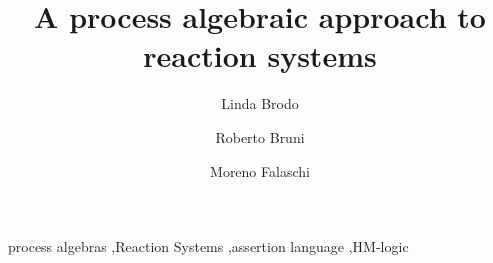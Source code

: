 \documentclass{elsarticle}
\begin{document}
\begin{frontmatter}

\title{A process algebraic approach to reaction systems
}



 \author[uniss]{Linda Brodo}
 
 \author[unipi]{Roberto Bruni}
 
 \author[unisi]{Moreno Falaschi}
 
 \address[unipi]{Dipartimento di Informatica, Universit\`{a} di Pisa, Italy}
 \address[uniss]{Dipartimento di Scienze Economiche e Aziendali,   Universit\`a di Sassari, Italy}
 \address[unisi]{Dipartimento di Ingegneria dell'Informazione e Scienze Matematiche,   Univ. di Siena, Italy}
 



\begin{abstract}

\end{abstract}

\begin{keyword}
process algebras \sep Reaction Systems \sep assertion language \sep HM-logic
\end{keyword}

\end{frontmatter}
\end{document}
